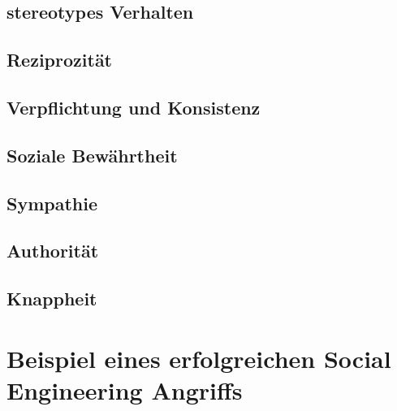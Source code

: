 \subsection{stereotypes Verhalten}
\subsection{Reziprozität}
\subsection{Verpflichtung und Konsistenz}
\subsection{Soziale Bewährtheit}
\subsection{Sympathie}
\subsection{Authorität}
\subsection{Knappheit}



\section{Beispiel eines erfolgreichen Social Engineering Angriffs}
